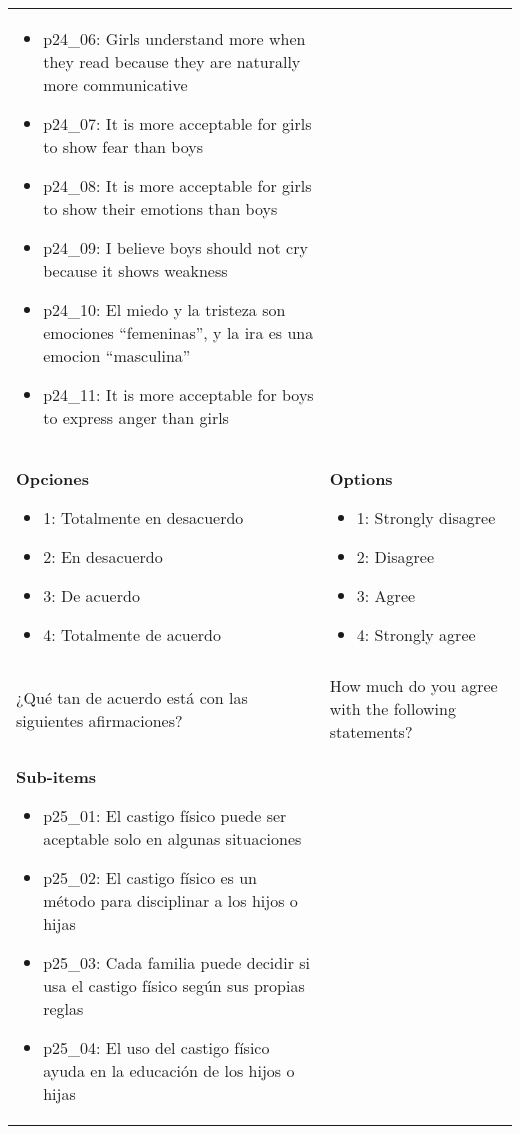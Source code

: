 \documentclass[11pt]{article}
\begin{document}
\begin{longtable}{@{}LL@{}}
\begin{itemize}[leftmargin=*]
\item p24\_06: Girls understand more when they read because they are naturally more communicative
\item p24\_07: It is more acceptable for girls to show fear than boys
\item p24\_08: It is more acceptable for girls to show their emotions than boys
\item p24\_09: I believe boys should not cry because it shows weakness
\item p24\_10: El miedo y la tristeza son emociones “femeninas”, y la ira es una emocion “masculina”
\item p24\_11: It is more acceptable for boys to express anger than girls\end{itemize} \\
\textbf{Opciones}\par\begin{itemize}[leftmargin=*]\item 1: Totalmente en desacuerdo
\item 2: En desacuerdo
\item 3: De acuerdo
\item 4: Totalmente de acuerdo\end{itemize} & \textbf{Options}\par\begin{itemize}[leftmargin=*]\item 1: Strongly disagree
\item 2: Disagree
\item 3: Agree
\item 4: Strongly agree\end{itemize} \\
\addlinespace[4pt]
 \\ 
¿Qué tan de acuerdo está con las siguientes afirmaciones? & How much do you agree with the following statements? \\
\textbf{Sub-items}\par\begin{itemize}[leftmargin=*]\item p25\_01: El castigo físico puede ser aceptable solo en algunas situaciones
\item p25\_02: El castigo físico es un método para disciplinar a los hijos o hijas
\item p25\_03: Cada familia puede decidir si usa el castigo físico según sus propias reglas
\item p25\_04: El uso del castigo físico ayuda en la educación de los hijos o hijas

\end{itemize}
\end{longtable}
\end{document}
